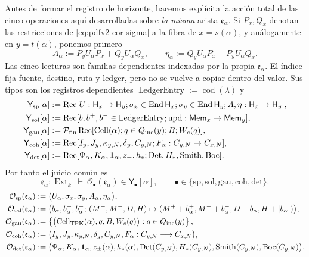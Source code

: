 Antes de formar el registro de horizonte, hacemos explícita la acción total
de las cinco operaciones aquí desarrolladas sobre \emph{la misma} arista
\(\mathfrak e_\alpha\). Si \(P_x,Q_x\) denotan las restricciones de
\eqref{eq:pdfv2-cor-sigma} a la fibra de \(x=s(\alpha)\), y análogamente en
\(y=t(\alpha)\), ponemos primero
\begin{equation}
\label{eq:pdfv2-cor-a-eta-emision}
 A_\alpha:=P_yU_\alpha P_x+Q_yU_\alpha Q_x,
 \qquad
 \eta_\alpha:=Q_yU_\alpha P_x+P_yU_\alpha Q_x.
\end{equation}
Las cinco lecturas son familias dependientes indexadas por la propia
\(\mathfrak e_\alpha\). El índice fija fuente, destino, ruta y ledger, pero
no se vuelve a copiar dentro del valor. Sus tipos son los registros
dependientes
\(\operatorname{LedgerEntry}:=\operatorname{cod}(\lambda)\) y
\begin{align*}
 \mathsf Y_{\rm sp}[\alpha]&:=
 \operatorname{Rec}[U:\mathsf H_x\to\mathsf H_y;
 \sigma_x\in\operatorname{End}\mathsf H_x;
 \sigma_y\in\operatorname{End}\mathsf H_y;A,\eta:\mathsf H_x\to\mathsf H_y],\\
 \mathsf Y_{\rm sol}[\alpha]&:=
 \operatorname{Rec}[b,b^+,b^-\in\operatorname{LedgerEntry};
 \operatorname{upd}:\mathsf{Mem}_x\to\mathsf{Mem}_y],\\
 \mathsf Y_{\rm gau}[\alpha]&:=
 \mathcal P_{\rm fin}\operatorname{Rec}[
 \operatorname{Cell}(\alpha);q\in Q_{\rm inc}(y);B;W_c(q)],\\
 \mathsf Y_{\rm coh}[\alpha]&:=
 \operatorname{Rec}[I_y,J_y,\kappa_{y,N},\delta_y,C_{y,N};
 F_\alpha:C_{y,N}\to C_{x,N}],\\
 \mathsf Y_{\rm det}[\alpha]&:=
 \operatorname{Rec}[\Psi_\alpha,K_\alpha,\mathbf1_\alpha,z_\pm,h_*;
 \operatorname{Det},H_*,\operatorname{Smith},\operatorname{Boc}].
\end{align*}
Por tanto el juicio común es
\[
 \mathfrak e_\alpha:\operatorname{Ext}_k\ \vdash\
 \mathcal O_\bullet(\mathfrak e_\alpha)
 \in\mathsf Y_\bullet[\alpha],
 \qquad
 \bullet\in\{\mathrm{sp,sol,gau,coh,det}\}.
\]
\begin{align}
 \mathcal O_{\rm sp}(\mathfrak e_\alpha)
 &:=
 \bigl(U_\alpha,\sigma_x,\sigma_y,
 A_\alpha,\eta_\alpha\bigr),
 \label{eq:pdfv2-cor-accion-sp}\\
 \mathcal O_{\rm sol}(\mathfrak e_\alpha)
 &:=
 \bigl(b_\alpha,b_\alpha^+,b_\alpha^-;\,
 (M^+,M^-,D,H)\mapsto
 (M^++b_\alpha^+,M^-+b_\alpha^-,
  D+b_\alpha,H+|b_\alpha|)\bigr),
 \label{eq:pdfv2-cor-accion-sol}\\
 \mathcal O_{\rm gau}(\mathfrak e_\alpha)
 &:=
 \left\{
 \bigl(\operatorname{Cell}_{\rm TPK}(\alpha),
 q,B,W_c(q)\bigr):
 q\in Q_{\rm inc}(y)
 \right\},
 \label{eq:pdfv2-cor-accion-gau}\\
 \mathcal O_{\rm coh}(\mathfrak e_\alpha)
 &:=
 \bigl(I_y,J_y,\kappa_{y,N},\delta_y,C_{y,N},
 F_\alpha:C_{y,N}\longrightarrow C_{x,N}\bigr),
 \label{eq:pdfv2-cor-accion-coh}\\
 \mathcal O_{\rm det}(\mathfrak e_\alpha)
 &:=
 \bigl(\Psi_\alpha,K_\alpha,\mathbf1_\alpha,z_\pm(\alpha),
 h_*(\alpha),\operatorname{Det}(C_{y,N}),H_*(C_{y,N}),
 \operatorname{Smith}(C_{y,N}),\operatorname{Boc}(C_{y,N})\bigr).
 \label{eq:pdfv2-cor-accion-det}
\end{align}

